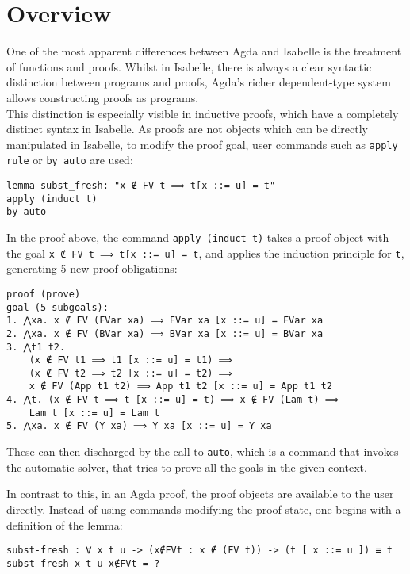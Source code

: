 \documentclass[a4paper, 12pt, twoside]{style/ociamthesis}
\theoremstyle{plain}
\theoremstyle{definition}
\theoremstyle{remark}
\begin{document}
\section{Overview}\label{overview-2}

One of the most apparent differences between Agda and Isabelle is the
treatment of functions and proofs. Whilst in Isabelle, there is always a
clear syntactic distinction between programs and proofs, Agda's richer
dependent-type system allows constructing proofs as programs.\\
This distinction is especially visible in inductive proofs, which have a
completely distinct syntax in Isabelle. As proofs are not objects which
can be directly manipulated in Isabelle, to modify the proof goal, user
commands such as \texttt{apply rule} or \texttt{by auto} are used:

\begin{verbatim}
lemma subst_fresh: "x ∉ FV t ⟹ t[x ::= u] = t"
apply (induct t)
by auto
\end{verbatim}

In the proof above, the command \texttt{apply (induct t)} takes a proof
object with the goal \texttt{x ∉ FV t ⟹ t[x ::= u] = t}, and applies the
induction principle for \texttt{t}, generating 5 new proof obligations:

\begin{verbatim}
proof (prove)
goal (5 subgoals):
1. ⋀xa. x ∉ FV (FVar xa) ⟹ FVar xa [x ::= u] = FVar xa
2. ⋀xa. x ∉ FV (BVar xa) ⟹ BVar xa [x ::= u] = BVar xa
3. ⋀t1 t2.
    (x ∉ FV t1 ⟹ t1 [x ::= u] = t1) ⟹
    (x ∉ FV t2 ⟹ t2 [x ::= u] = t2) ⟹
    x ∉ FV (App t1 t2) ⟹ App t1 t2 [x ::= u] = App t1 t2
4. ⋀t. (x ∉ FV t ⟹ t [x ::= u] = t) ⟹ x ∉ FV (Lam t) ⟹ 
    Lam t [x ::= u] = Lam t
5. ⋀xa. x ∉ FV (Y xa) ⟹ Y xa [x ::= u] = Y xa
\end{verbatim}

These can then discharged by the call to \texttt{auto}, which is a
command that invokes the automatic solver, that tries to prove all the
goals in the given context.

In contrast to this, in an Agda proof, the proof objects are available
to the user directly. Instead of using commands modifying the proof
state, one begins with a definition of the lemma:

\begin{verbatim}
subst-fresh : ∀ x t u -> (x∉FVt : x ∉ (FV t)) -> (t [ x ::= u ]) ≡ t
subst-fresh x t u x∉FVt = ?
\end{verbatim}
\end{document}
